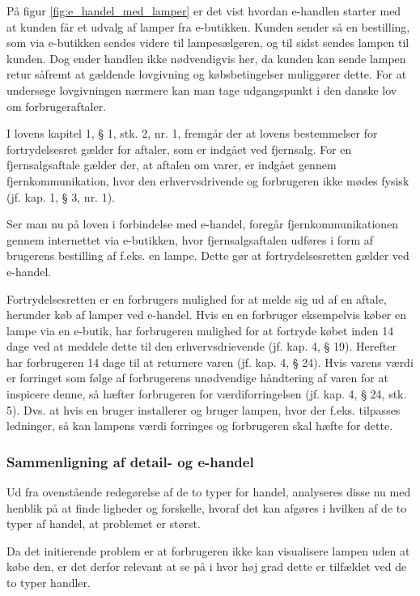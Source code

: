 På figur \ref{fig:e_handel_med_lamper} er det vist hvordan e-handlen starter med at kunden får et udvalg af lamper fra e-butikken. Kunden sender så en bestilling, som via e-butikken sendes videre til lampesælgeren, og til sidst sendes lampen til kunden. Dog ender handlen ikke nødvendigvis her, da kunden kan sende lampen retur såfremt at gældende lovgivning og købsbetingelser muliggører dette. For at undersøge lovgivningen nærmere kan man tage udgangspunkt i den danske lov om forbrugeraftaler\cite{retsinformationen}.

I lovens kapitel 1, § 1, stk. 2, nr. 1, fremgår der at lovens bestemmelser for fortrydelsesret gælder for aftaler, som er indgået ved fjernsalg. For en  fjernsalgsaftale gælder der, at aftalen om varer, er indgået gennem fjernkommunikation, hvor den erhvervsdrivende og forbrugeren ikke mødes fysisk (jf. kap. 1, § 3, nr. 1).

Ser man nu på loven i forbindelse med e-handel, foregår fjernkommunikationen gennem internettet via e-butikken, hvor fjernsalgsaftalen udføres i form af brugerens bestilling af f.eks. en lampe. Dette gør at fortrydelsesretten gælder ved e-handel.

Fortrydelsesretten er en forbrugers mulighed for at melde sig ud af en aftale, herunder køb af lamper ved e-handel. Hvis en en forbruger eksempelvis køber en lampe via en e-butik, har forbrugeren mulighed for at fortryde købet inden 14 dage ved at meddele dette til den erhvervsdrievende (jf. kap. 4, § 19). Herefter har forbrugeren 14 dage til at returnere varen (jf. kap. 4, § 24). Hvis varens værdi er forringet som følge af forbrugerens unødvendige håndtering af varen for at inspicere denne, så hæfter forbrugeren for værdiforringelsen (jf. kap. 4, § 24, stk. 5). Dvs. at hvis en bruger installerer og bruger lampen, hvor der f.eks. tilpasses ledninger, så kan lampens værdi forringes og forbrugeren skal hæfte for dette. 

\subsubsection{Sammenligning af detail- og e-handel}
Ud fra ovenstående redegørelse af de to typer for handel, analyseres disse nu med henblik på at finde ligheder og forskelle, hvoraf det kan afgøres i hvilken af de to typer af handel, at problemet er størst. 

Da det initierende problem er at forbrugeren ikke kan visualisere lampen uden at købe den, er det derfor relevant at se på i hvor høj grad dette er tilfældet ved de to typer handler.

